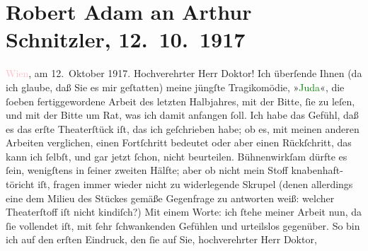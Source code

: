 

               \section[Robert Adam an Arthur Schnitzler, 12. 10. 1917]{ Robert Adam an Arthur Schnitzler, 12. 10. 1917}\nopagebreak{}\rehead{ }\normalsize\beginnumbering{} \toendnotes[C]{\smallbreak\pagebreak[2]} 
\pstart
           \raggedleft{}{\pb}\textcolor{pink}{Wien}{}\ledrightnote{\textcolor{pink}{Wien}}, am 12. Oktober
                        1917.\pend
           \pstart{}Hochverehrter Herr Doktor!\pend\pstart
           Ich überſende Ihnen (da ich glaube, daß Sie es mir geſtatten) meine jüngſte
                    Tragikomödie, »\textcolor{green}{Juda}{}\ledrightnote{\textcolor{green}{Das Ende des Judas}}«, die ſoeben
                    fertiggewordene Arbeit des letzten Halbjahres, mit der Bitte, ſie zu leſen, und
                    mit der Bitte um Rat, was ich damit anfangen ſoll. Ich habe das Gefühl, daß es
                    das erſte Theaterſtück iſt, das ich geſchrieben habe; ob es, mit meinen anderen
                    Arbeiten verglichen, einen Fortſchritt bedeutet oder aber einen Rückſchritt, das
                    kann ich ſelbſt, und gar jetzt ſchon, nicht beurteilen. Bühnenwirkſam dürfte es
                    ſein, wenigſtens in ſeiner zweiten Hälfte; aber ob nicht mein Stoff {\pb}knabenhaft-töricht iſt, fragen immer wieder
                    nicht zu widerlegende Skrupel (denen allerdings eine dem Milieu des Stückes
                    gemäße Gegenfrage zu antworten weiß: welcher Theaterſtoff iſt nicht kindiſch?)
                    Mit einem Worte: ich ſtehe meiner Arbeit nun, da ſie vollendet iſt, mit ſehr
                    ſchwankenden Gefühlen und urteilslos gegenüber.\pend
           \pstart
           So bin ich auf den erſten Eindruck, den ſie auf Sie, hochverehrter Herr Doktor,
